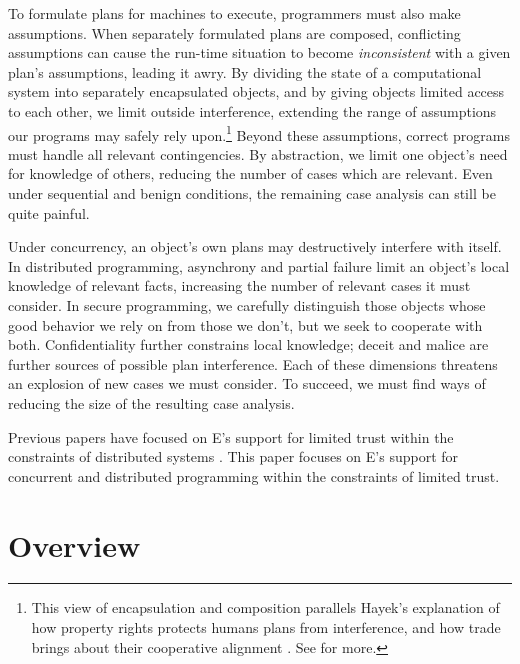 \documentclass{llncs}
\begin{document}
To formulate plans for machines to execute, programmers must also make
assumptions. When separately formulated plans are composed,
conflicting assumptions can cause the run-time situation to become
\emph{inconsistent} with a given plan's assumptions, leading it
awry. By dividing the state of a computational system into separately
encapsulated objects, and by giving objects limited access to each
other, we limit outside interference, extending the range of
assumptions our programs may safely rely upon.\footnote{
%
This view of encapsulation and composition parallels Hayek's
explanation of how property rights protects humans plans from
interference, and how trade brings about their cooperative alignment
\cite{Hayek:1945:UKS}. See \cite{miller:agoric,tulloh:abstraction} for
more.}
%
Beyond these assumptions, correct programs must handle all relevant
contingencies. By abstraction, we limit one object's need for
knowledge of others, reducing the number of cases which are
relevant. Even under sequential and benign conditions, the remaining
case analysis can still be quite painful.

Under concurrency, an object's own plans may destructively interfere
with itself. In distributed programming, asynchrony and partial
failure limit an object's local knowledge of relevant facts,
increasing the number of relevant cases it must consider. In secure
programming, we carefully distinguish those objects whose good
behavior we rely on from those we don't, but we seek to cooperate with
both. Confidentiality further constrains local knowledge; deceit and
malice are further sources of possible plan interference. Each of
these dimensions threatens an explosion of new cases we must
consider. To succeed, we must find ways of reducing the size of the
resulting case analysis.

Previous papers have focused on E's support for limited trust within
the constraints of distributed systems
\cite{miller:ode,miller:myths,miller:paradigm,miller:struct-auth}. This
paper focuses on E's support for concurrent and distributed
programming within the constraints of limited trust.

\section{Overview}
\end{document}
